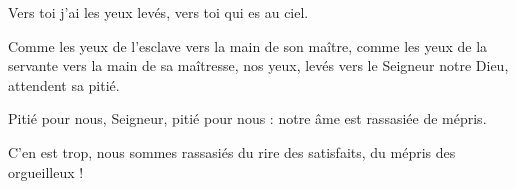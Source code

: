 \item Vers toi j'ai les yeux levés, vers toi qui es au ciel.

\item Comme les yeux de l'esclave vers la main de son maître, comme les yeux de la servante vers la main de sa maîtresse, nos yeux, levés vers le Seigneur notre Dieu, attendent sa pitié.

\item Pitié pour nous, Seigneur, pitié pour nous : notre âme est rassasiée de mépris.

\item C'en est trop, nous sommes rassasiés du rire des satisfaits, du mépris des orgueilleux !